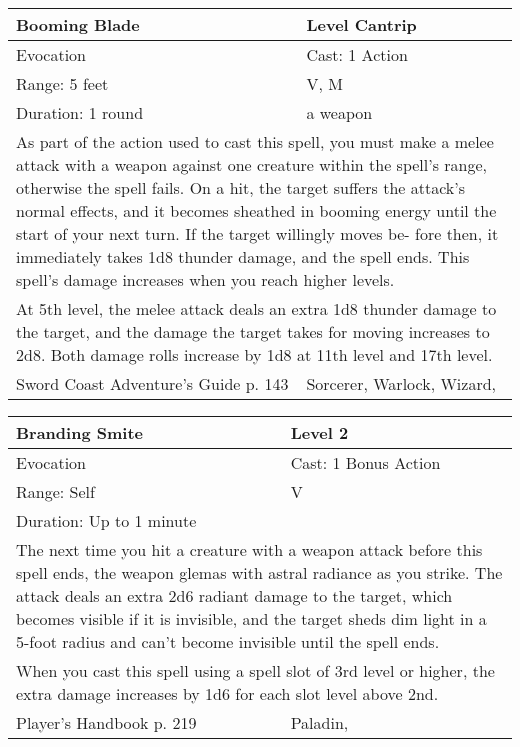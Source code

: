 \documentclass[11pt]{report}
\begin{document}
\begin{table}[H]
	\begin{tabular}{||p{6cm}|p{6cm}||}
		\hline\hline
		\bf{Booming Blade} & Level Cantrip\\ \hline
		Evocation & Cast: 1 Action\\ \hline
		Range: 5 feet & V, M\\ \hline
		Duration: 1 round & a weapon\\ \hline
		\multicolumn{2}{||p{12cm}||}{As part of the action used to cast this spell, you must make a melee attack with a weapon against one creature within the spell's range, otherwise the spell fails.
On a hit, the target suffers the attack's normal effects, and it becomes sheathed in booming energy until the start of your next turn. If the target willingly moves be- fore then, it immediately takes 1d8 thunder damage, and the spell ends.
This spell's damage increases when you reach higher levels.}\\ \hline
		\multicolumn{2}{||p{12cm}||}{At 5th level, the melee attack deals an extra 1d8 thunder damage to the target, and the damage the target takes for moving increases to 2d8. Both damage rolls increase by 1d8 at 11th level and 17th level.}\\ \hline
Sword Coast Adventure's Guide p. 143 & Sorcerer, Warlock, Wizard, \\ \hline\hline
	\end{tabular}
\end{table}

\begin{table}[H]
	\begin{tabular}{||p{6cm}|p{6cm}||}
		\hline\hline
		\bf{Branding Smite} & Level 2\\ \hline
		Evocation & Cast: 1 Bonus Action\\ \hline
		Range: Self & V\\ \hline
		Duration: Up to 1 minute & \\ \hline
		\multicolumn{2}{||p{12cm}||}{The next time you hit a creature with a weapon attack before this spell ends, the weapon glemas with astral radiance as you strike. The attack deals an extra 2d6 radiant damage to the target, which becomes visible if it is invisible, and the target sheds dim light in a 5-foot radius and can’t become invisible until the spell ends.}\\ \hline
		\multicolumn{2}{||p{12cm}||}{When you cast this spell using a spell slot of 3rd level or higher, the extra damage increases by 1d6 for each slot level above 2nd.}\\ \hline
Player's Handbook p. 219 & Paladin, \\ \hline\hline
	\end{tabular}
\end{table}
\end{document}
